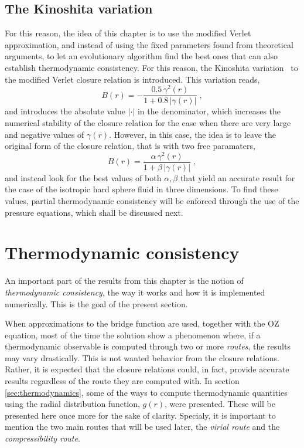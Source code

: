 \subsection{The Kinoshita variation}
For this reason, the idea of this chapter is to use the modified Verlet approximation, and instead of using the fixed parameters found from theoretical arguments, to let an evolutionary algorithm find the best ones that can also establish thermodynamic consistency. For this reason, the Kinoshita variation~\cite{kinoshitaInteractionSurfacesSolvophobicity2003} to the modified Verlet closure relation is introduced. This variation reads,
\begin{equation}
    B(r) = - \frac{0.5 \, \gamma^{2}(r)}{1 + 0.8 \, \left\lvert \gamma(r) \right\rvert}
    \; ,
    \label{eq:kinoshita}
\end{equation}
and introduces the absolute value \(\left\lvert \cdot \right\rvert\) in the denominator, 
which increases the numerical stability of the closure relation for the case when there are 
very large and negative values of \(\gamma(r)\). However, in this case, the idea is to leave the original form of the closure relation, that is with two free paramaters,
\begin{equation}
    B(r) = \frac{\alpha \, \gamma^{2}(r)}{1 + \beta \, \left\lvert \gamma(r) \right\rvert}
    \; ,
    \label{eq:kinoshita-params}
\end{equation}
and instead look for the best values of both \(\alpha, \beta\) that yield an accurate 
result for the case of the isotropic hard sphere fluid in three dimensions.
To find these values, partial thermodynamic consistency will be enforced through the use of 
the pressure equations, which shall be discussed next.

\section{Thermodynamic consistency}
An important part of the results from this chapter is the notion of 
\emph{thermodynamic consistency}, the way it works and how it is implemented numerically. 
This is the goal of the present section.

When approximations to the bridge function are used, together with the OZ equation, most of 
the time the solution show a phenomenon where, if a thermodynamic observable is computed 
through two or more \emph{routes}, the results may vary drastically. This is not wanted 
behavior from the closure relations. Rather, it is expected that the closure relations 
could, in fact, provide accurate results regardless of the route they are computed with.
In section \autoref{sec:thermodynamics}, some of the ways to compute thermodynamic 
quantities using the radial distribution function, \(g(r)\), were presented. These will be 
presented here once more for the sake of clarity. Specialy, it is important to mention the 
two main routes that will be used later, the \emph{virial route} and the 
\emph{compressibility route}.

